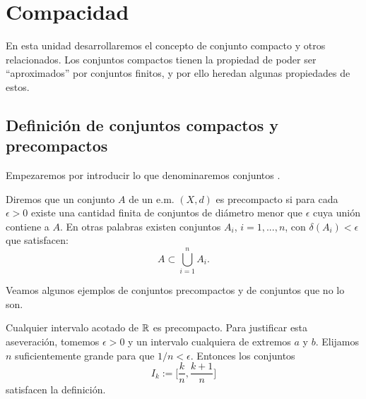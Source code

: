 
\chapter{Compacidad}

En esta unidad desarrollaremos el concepto de conjunto compacto y
otros relacionados. Los conjuntos compactos tienen la propiedad de
poder ser ``aproximados'' por conjuntos finitos, y por ello
heredan algunas propiedades de estos.

\section{Definici\'on de conjuntos compactos y precompactos}

Empezaremos por introducir lo que denominaremos conjuntos
.

\begin{definicion}  Diremos que un conjunto $A$ de un e.m. $(X,d)$ es precompacto
si para cada $\epsilon>0$ existe una cantidad finita de conjuntos
de di\'ametro menor que $\epsilon$ cuya uni\'on contiene a  $A$.
En otras palabras existen conjuntos $A_i$, $i=1,...,n$, con
$\delta(A_i)<\epsilon$ que satisfacen:
\[
    A\subset \bigcup\limits_{i=1}^nA_i.
\]
\end{definicion}

Veamos algunos ejemplos de conjuntos precompactos y de conjuntos
que no lo son.

\begin{ejemplo} Cualquier intervalo acotado de $\rr$ es
precompacto. Para justificar esta aseveraci\'on, tomemos
$\epsilon>0$ y un intervalo cualquiera de extremos $a$ y $b$.
Elijamos $n$ suficientemente grande para que $1/n<\epsilon$.
Entonces los conjuntos
\[
    I_k:=\bigl[\frac{k}{n},\frac{k+1}{n}\bigr]
\]
satisfacen la definici\'on.
\end{ejemplo}

